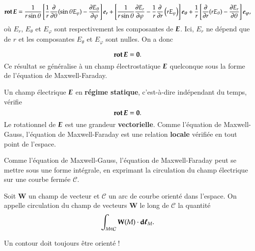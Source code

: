 \begin{equation*}
	\rot \vece = \dfrac{1}{r \sin \theta}\left[\dfrac{1}{r}
		\dfrac{\partial}{\ddtheta}(\sin \theta E_\varphi) - 
	        \dfrac{\partial E_\theta}{\ddphi}\right]\er + 
		\left[\dfrac{1}{r\sin \theta}\dfrac{\partial E_r}{\ddphi} -
		\dfrac{1}{r}\dfrac{\partial}{\ddr}\left(rE_\varphi\right)\right]\etheta
		+ \dfrac{1}{r}\left[\dfrac{\partial}{\ddr}(r E_\theta)
		- \dfrac{\partial E_r}{\ddtheta}\right]\ephi,
\end{equation*}
où $E_r$, $E_\theta$ et $E_\varphi$ sont respectivement les composantes de
$\vece$. Ici, $E_r$ ne dépend que de $r$ et les composantes $E_\theta$ et 
$E_\varphi$ sont nulles. On a donc 

\begin{equation*}
	\rot \vece = \mitbf{0}.
\end{equation*}
Ce résultat se généralise à un champ électrostatique $\vece$ quelconque sous la
forme de l'équation de Maxwell-Faraday.

\begin{defn}
	Un champ électrique $\vece$ en \textbf{régime statique}, c'est-à-dire
	indépendant du temps, vérifie 
	\begin{equation}
		\rot \vece = \mitbf{0}.
	\end{equation}
	Le rotationnel de $\vece$ est une grandeur \textbf{vectorielle}. Comme
	l'équation de Maxwell-Gauss, l'équation de Maxwell-Faraday est 
	une relation \textbf{locale} vérifiée
	en tout point de l'espace.
\end{defn}

Comme l'équation de Maxwell-Gauss, l'équation de Maxwell-Faraday peut se mettre 
sous une forme intégrale, en exprimant la circulation du champ électrique sur
une courbe fermée $\mathcal{C}$.

\begin{defn}
	Soit $\mathbf{W}$ un champ de vecteur et $\mathcal{C}$ un arc de courbe orienté 
	dans l'espace. On appelle circulation du champ de vecteurs $\mathbf{W}$
	le long de $\mathcal{C}$ la quantité
	\begin{equation*}
		\int_{M \in \mathcal{C}} \mathbf{W}(M) \cdot \dl_M.
	\end{equation*}
\end{defn}

\begin{attention}
	Un contour doit toujours être orienté !
\end{attention}

